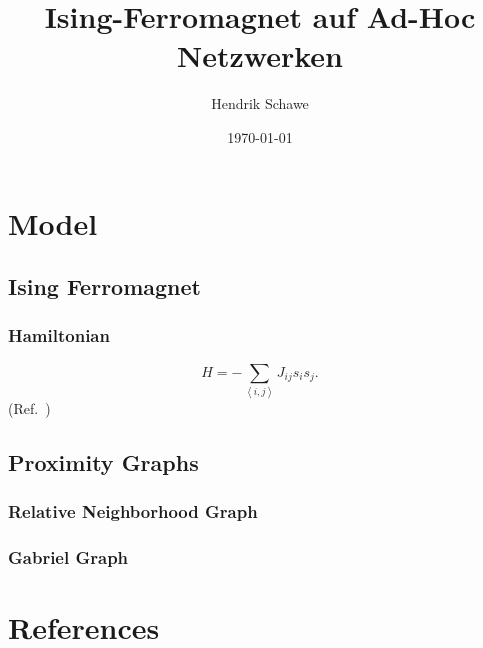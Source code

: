 \documentclass{beamer}
\title{Ising-Ferromagnet auf Ad-Hoc Netzwerken}
\author{Hendrik Schawe}
\date{\today}
\newcommand{\avg}[1]{\left< #1 \right>}
\begin{document}
\maketitle
\frame{\tableofcontents[pausesections]}

\section{Model}
    \subsection{Ising Ferromagnet}
        \begin{frame}
            \frametitle{Hamiltonian}
            \begin{equation}
                H = - \sum_{\avg{i,j}}J_{ij}s_{i}s_{j}.
            \end{equation}
            (Ref.\ \cite{Ising1925})
        \end{frame}
    \subsection{Proximity Graphs}
        \begin{frame}
            \frametitle{Relative Neighborhood Graph}
        \end{frame}
        \begin{frame}
            \frametitle{Gabriel Graph}
        \end{frame}

\section{References}
    \begin{frame}[allowframebreaks]
        
        
    \end{frame}
\end{document}
